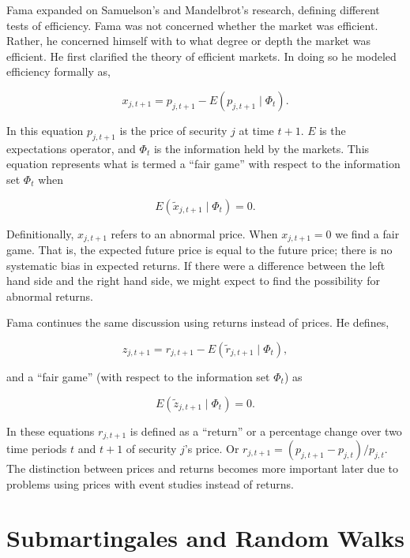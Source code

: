 Fama \cite{fama70} expanded on Samuelson's and Mandelbrot's research, defining different tests of efficiency. Fama was not concerned whether the market was efficient. Rather, he concerned himself with to what degree or depth the market was efficient. He first clarified the theory of efficient markets. In doing so he modeled efficiency formally as,

\begin{equation}
x_{j,t+1}=p_{j,t+1}-E(p_{j,t+1} \mid \Phi_{t}).
\end{equation}

In this equation $p_{j,t+1}$ is the price of security $j$ at time $t+1$. $E$ is the expectations operator, and $\Phi_{t}$ is the information held by the markets. This equation represents what is termed a ``fair game'' with respect to the information set $\Phi_{t}$ when

\begin{equation}
E(\tilde x_{j,t+1} \mid \Phi_{t})=0.
\end{equation}

Definitionally, $x_{j,t+1}$ refers to an abnormal price. When $x_{j,t+1}=0$ we find a fair game. That is, the expected future price is equal to the future price; there is no systematic bias in expected returns. If there were a difference between the left hand side and the right hand side, we might expect to find the possibility for abnormal returns.

Fama continues the same discussion using returns instead of prices. He defines,

\begin{equation}
z_{j,t+1}=r_{j,t+1}-E(\tilde r_{j,t+1} \mid \Phi_{t}),
\end{equation}

and a ``fair game'' (with respect to the information set $\Phi_{t}$) as

\begin{equation}
E(\tilde z_{j,t+1} \mid \Phi_{t}) = 0.
\end{equation}

In these equations $r_{j,t+1}$ is defined as a ``return'' or a percentage change over two time periods $t$ and $t+1$ of security $j$'s price. Or $r_{j,t+1} = (p_{j,t+1}-p_{j,t})/p_{j,t}$. The distinction between prices and returns becomes more important later due to problems using prices with event studies instead of returns.

\section{Submartingales and Random Walks}

